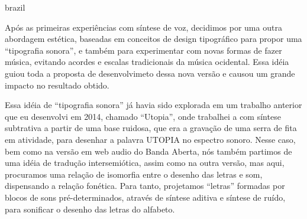 \begin{otherlanguage*}{brazil}

Após as primeiras experiências com síntese de voz, decidimos por uma outra abordagem estética, baseadas em conceitos de design tipográfico \cite{ruder_typography:_2009} para propor uma ``tipografia sonora'', e também para experimentar com novas formas de fazer música, evitando acordes e escalas tradicionais da música ocidental. Essa idéia guiou toda a proposta de desenvolvimeto dessa nova versão e causou um grande impacto no resultado obtido.

Essa idéia de ``tipografia sonora'' já havia sido explorada em um trabalho anterior que eu desenvolvi em 2014, chamado ``Utopia'', onde trabalhei a com síntese subtrativa a partir de uma base ruidosa, que era a gravação de uma serra de fita em atividade, para desenhar a palavra UTOPIA no espectro sonoro. Nesse caso, bem como na versão em web audio do Banda Aberta, nós também partimos de uma idéia de tradução intersemiótica, assim como na outra versão, mas aqui, procuramos uma relação de isomorfia entre o desenho das letras e som, dispensando a relação fonética. Para tanto, projetamos ``letras'' formadas por blocos de sons pré-determinados, através de síntese aditiva e síntese de ruído, para sonificar o desenho das letras do alfabeto.





\end{otherlanguage*}
